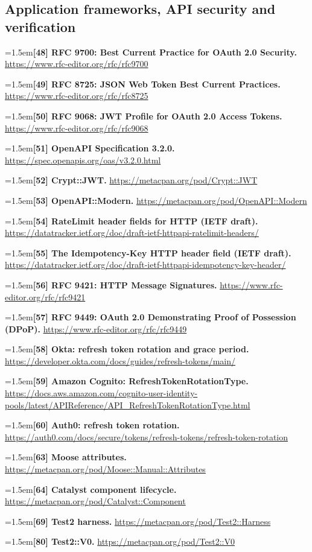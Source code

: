 \documentclass[11pt,openany]{book}
\newcommand{\refdoc}[2]{\par\hangindent=1.5em\hangafter=1\textbf{#1.} \url{#2}\par}
\begin{document}
\subsection{Application frameworks, API security and verification}
\refdoc{[48] RFC 9700: Best Current Practice for OAuth 2.0 Security}{https://www.rfc-editor.org/rfc/rfc9700}
\refdoc{[49] RFC 8725: JSON Web Token Best Current Practices}{https://www.rfc-editor.org/rfc/rfc8725}
\refdoc{[50] RFC 9068: JWT Profile for OAuth 2.0 Access Tokens}{https://www.rfc-editor.org/rfc/rfc9068}
\refdoc{[51] OpenAPI Specification 3.2.0}{https://spec.openapis.org/oas/v3.2.0.html}
\refdoc{[52] Crypt::JWT}{https://metacpan.org/pod/Crypt::JWT}
\refdoc{[53] OpenAPI::Modern}{https://metacpan.org/pod/OpenAPI::Modern}
\refdoc{[54] RateLimit header fields for HTTP (IETF draft)}{https://datatracker.ietf.org/doc/draft-ietf-httpapi-ratelimit-headers/}
\refdoc{[55] The Idempotency-Key HTTP header field (IETF draft)}{https://datatracker.ietf.org/doc/draft-ietf-httpapi-idempotency-key-header/}
\refdoc{[56] RFC 9421: HTTP Message Signatures}{https://www.rfc-editor.org/rfc/rfc9421}
\refdoc{[57] RFC 9449: OAuth 2.0 Demonstrating Proof of Possession (DPoP)}{https://www.rfc-editor.org/rfc/rfc9449}
\refdoc{[58] Okta: refresh token rotation and grace period}{https://developer.okta.com/docs/guides/refresh-tokens/main/}
\refdoc{[59] Amazon Cognito: RefreshTokenRotationType}{https://docs.aws.amazon.com/cognito-user-identity-pools/latest/APIReference/API_RefreshTokenRotationType.html}
\refdoc{[60] Auth0: refresh token rotation}{https://auth0.com/docs/secure/tokens/refresh-tokens/refresh-token-rotation}
\refdoc{[63] Moose attributes}{https://metacpan.org/pod/Moose::Manual::Attributes}
\refdoc{[64] Catalyst component lifecycle}{https://metacpan.org/pod/Catalyst::Component}
\refdoc{[69] Test2 harness}{https://metacpan.org/pod/Test2::Harness}
\refdoc{[80] Test2::V0}{https://metacpan.org/pod/Test2::V0}
\endgroup

\clearpage
\renewcommand{\indexname}{Subject and API index}
{}
\printindex
\end{document}
